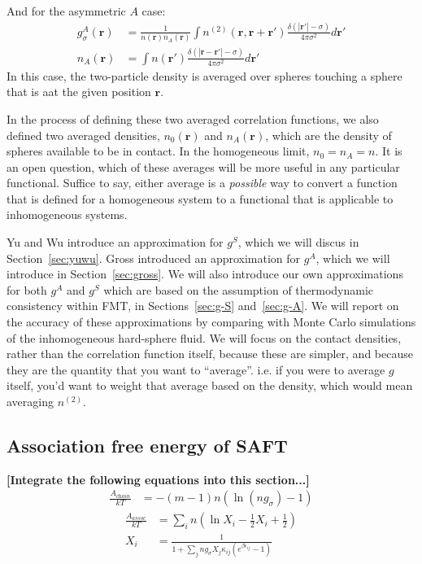 \documentclass[letterpaper,twocolumn,amsmath,amssymb,jcp,10pt,aip]{revtex4-1}
\newcommand{\red}[1]{{\bf \color{red} #1}}
\newcommand{\rr}{\textbf{r}}
\newcommand{\fixme}[1]{\red{[#1]}}
\begin{document}
And for the asymmetric $A$ case:
\begin{align}
  g^A_\sigma(\rr) &= \frac{1}{n(\rr)n_A(\rr)}
  \int n^{(2)}(\rr, \rr + \rr')
  \frac{\delta(|\rr'| - \sigma)}{4\pi\sigma^2}d\rr' \\
  n_A(\rr) &= \int n(\rr')
  \frac{\delta(|\rr-\rr'|-\sigma)}{4\pi\sigma^2} d\rr'
\end{align}
In this case, the two-particle density is averaged over spheres
touching a sphere that is aat the given position $\rr$.

In the process of defining these two averaged correlation functions,
we also defined two averaged densities, $n_0(\rr)$ and $n_A(\rr)$,
which are the density of spheres available to be in
contact.  In the homogeneous limit, $n_0 = n_A = n$.  It is an
open question, which of these averages will be more useful in any
particular functional.  Suffice to say, either average is a
\emph{possible} way to convert a function that is defined for a
homogeneous system to a functional that is applicable to inhomogeneous
systems.

Yu and Wu introduce an approximation for
$g^S$\cite{yu2002fmt-dft-inhomogeneous-associating}, which we will
discus in Section~\ref{sec:yuwu}.  Gross introduced an
approximation for $g^A$\cite{gross2009density}, which we will
introduce in Section~\ref{sec:gross}.  We will also introduce our own
approximations for both $g^A$ and $g^S$ which are based on the
assumption of thermodynamic consistency within FMT, in
Sections~\ref{sec:g-S} and~\ref{sec:g-A}.  We will report on the accuracy of
these approximations by comparing with Monte Carlo simulations of the
inhomogeneous hard-sphere fluid.  We will focus on the contact
densities, rather than the correlation function itself, because these
are simpler, and because they are the quantity that you want to
``average''.  i.e. if you were to average $g$ itself, you'd want to
weight that average based on the density, which would mean averaging
$n^{(2)}$.


\subsection{Association free energy of SAFT}

\fixme{Integrate the following equations into this section...}
\begin{align}
  \frac{A_\textit{chain}}{kT} &= -(m-1) n \left(\ln\left(n g_\sigma \right)-1\right)
\end{align}
\begin{align}
  \frac{A_\textit{assoc}}{kT} &= \sum_i n \left(\ln X_i - \frac12 X_i + \frac12\right) \\
  X_i &= \frac{1}{1 + \sum_j n g_\sigma X_j\kappa_{ij} \left(e^{\beta \epsilon_{ij}}-1\right)}
\end{align}
\end{document}
